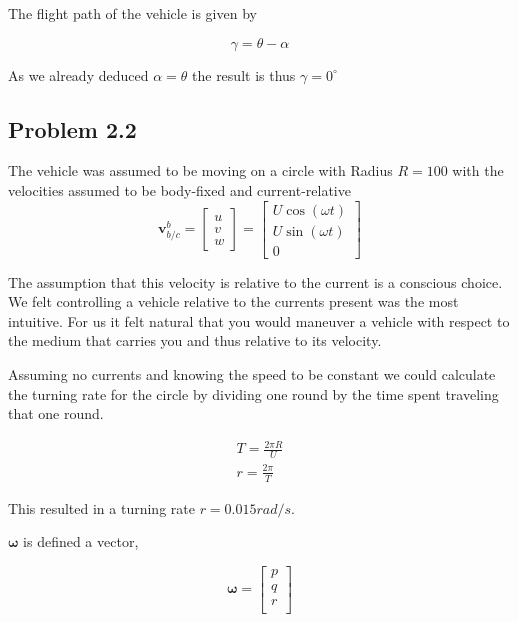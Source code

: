 The flight path of the vehicle is given by 

\begin{equation}
    \gamma = \theta - \alpha
\end{equation}

As we already deduced $\alpha = \theta$ the result is thus $\gamma = 0^\circ$

\subsection*{Problem 2.2}
The vehicle was assumed to be moving on a circle with Radius $R = 100$ with the velocities assumed to be body-fixed and current-relative
\begin{equation}
\label{eq:velocity}
    \mathbf{v}^b_{b/c} = 
	\begin{bmatrix}
		u \\
		v \\
		w
	\end{bmatrix}
	= 
	\begin{bmatrix}
		U \cos( \omega t)\\
		U \sin(\omega t)\\
		0	
	\end{bmatrix}
\end{equation}

The assumption that this velocity is relative to the current is a conscious choice. We felt controlling a vehicle relative to the currents present was the most intuitive. For us it felt natural that you would maneuver a vehicle with respect to the medium that carries you and thus relative to its velocity.

Assuming no currents and knowing the speed to be constant we could calculate the turning rate for the circle by dividing one round by the time spent traveling that one round.

\begin{subequations}
    \begin{align}
        T = \frac{2\pi R}{U} \\
        r = \frac{2\pi}{T}
    \end{align}
\end{subequations}

This resulted in a turning rate $r = 0.015 rad/s$.

$\boldsymbol{\omega}$ is defined a vector, 

\begin{equation}
    \boldsymbol{\omega} =
    \begin{bmatrix}
        p \\
        q \\
        r \\
    \end{bmatrix}
\end{equation}


